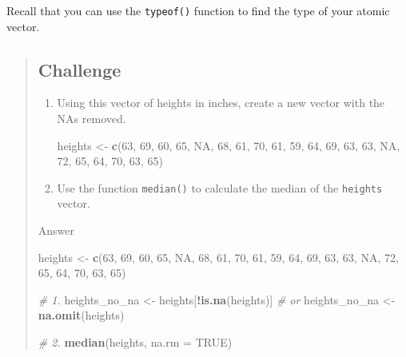 \documentclass[]{book}
\newenvironment{Shaded}{\begin{snugshade}}{\end{snugshade}}
\newcommand{\KeywordTok}[1]{\textcolor[rgb]{0.13,0.29,0.53}{\textbf{#1}}}
\newcommand{\DataTypeTok}[1]{\textcolor[rgb]{0.13,0.29,0.53}{#1}}
\newcommand{\DecValTok}[1]{\textcolor[rgb]{0.00,0.00,0.81}{#1}}
\newcommand{\StringTok}[1]{\textcolor[rgb]{0.31,0.60,0.02}{#1}}
\newcommand{\CommentTok}[1]{\textcolor[rgb]{0.56,0.35,0.01}{\textit{#1}}}
\newcommand{\OtherTok}[1]{\textcolor[rgb]{0.56,0.35,0.01}{#1}}
\newcommand{\OperatorTok}[1]{\textcolor[rgb]{0.81,0.36,0.00}{\textbf{#1}}}
\newcommand{\NormalTok}[1]{#1}
\begin{document}
Recall that you can use the \texttt{typeof()} function to find the type
of your atomic vector.

\begin{quote}
\subsection{Challenge}\label{challenge-2}

\begin{enumerate}
\def\labelenumi{\arabic{enumi}.}
\item
  Using this vector of heights in inches, create a new vector with the
  NAs removed.

\begin{Shaded}
\begin{Highlighting}[]
\NormalTok{heights <-}\StringTok{ }\KeywordTok{c}\NormalTok{(}\DecValTok{63}\NormalTok{, }\DecValTok{69}\NormalTok{, }\DecValTok{60}\NormalTok{, }\DecValTok{65}\NormalTok{, }\OtherTok{NA}\NormalTok{, }\DecValTok{68}\NormalTok{, }\DecValTok{61}\NormalTok{, }\DecValTok{70}\NormalTok{, }\DecValTok{61}\NormalTok{, }\DecValTok{59}\NormalTok{, }\DecValTok{64}\NormalTok{, }\DecValTok{69}\NormalTok{, }\DecValTok{63}\NormalTok{, }\DecValTok{63}\NormalTok{, }\OtherTok{NA}\NormalTok{, }\DecValTok{72}\NormalTok{, }\DecValTok{65}\NormalTok{, }\DecValTok{64}\NormalTok{, }\DecValTok{70}\NormalTok{, }\DecValTok{63}\NormalTok{, }\DecValTok{65}\NormalTok{)}
\end{Highlighting}
\end{Shaded}
\item
  Use the function \texttt{median()} to calculate the median of the
  \texttt{heights} vector.
\end{enumerate}

Answer

\begin{Shaded}
\begin{Highlighting}[]
\NormalTok{heights <-}\StringTok{ }\KeywordTok{c}\NormalTok{(}\DecValTok{63}\NormalTok{, }\DecValTok{69}\NormalTok{, }\DecValTok{60}\NormalTok{, }\DecValTok{65}\NormalTok{, }\OtherTok{NA}\NormalTok{, }\DecValTok{68}\NormalTok{, }\DecValTok{61}\NormalTok{, }\DecValTok{70}\NormalTok{, }\DecValTok{61}\NormalTok{, }\DecValTok{59}\NormalTok{, }\DecValTok{64}\NormalTok{, }\DecValTok{69}\NormalTok{, }\DecValTok{63}\NormalTok{, }\DecValTok{63}\NormalTok{, }\OtherTok{NA}\NormalTok{, }\DecValTok{72}\NormalTok{, }\DecValTok{65}\NormalTok{, }\DecValTok{64}\NormalTok{, }\DecValTok{70}\NormalTok{, }\DecValTok{63}\NormalTok{, }\DecValTok{65}\NormalTok{)}

\CommentTok{# 1.}
\NormalTok{heights_no_na <-}\StringTok{ }\NormalTok{heights[}\OperatorTok{!}\KeywordTok{is.na}\NormalTok{(heights)] }
\CommentTok{# or}
\NormalTok{heights_no_na <-}\StringTok{ }\KeywordTok{na.omit}\NormalTok{(heights)}

\CommentTok{# 2.}
\KeywordTok{median}\NormalTok{(heights, }\DataTypeTok{na.rm =} \OtherTok{TRUE}\NormalTok{)}
\end{Highlighting}
\end{Shaded}
\end{quote}
\end{document}
